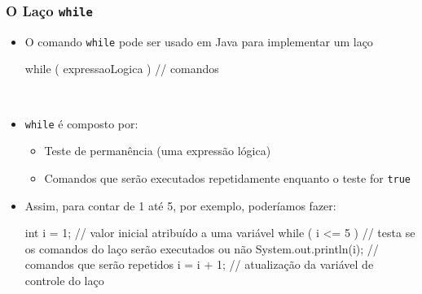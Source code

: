\documentclass[xcolor={dvipsnames,table},aspectratio=169]{beamer}
\begin{document}
\begin{frame}[fragile]\frametitle{O Laço \texttt{while}}
\begin{itemize}
	\item O comando \texttt{while} pode ser usado em Java para implementar um laço\\
{\scriptsize
\begin{javacode}
while ( expressaoLogica ) {
      // comandos
}
\end{javacode}
}\\
	\item \texttt{while} é composto por:\\
	\begin{itemize}
		\item Teste de permanência (uma expressão lógica)\\
		\item Comandos que serão executados repetidamente enquanto o teste for \texttt{true}\\
	\end{itemize}
	\item Assim, para contar de 1 até 5, por exemplo, poderíamos fazer:\\
{\scriptsize
\begin{javacode}
int i = 1;                    // valor inicial atribuído a uma variável
while ( i <= 5 ) {            // testa se os comandos do laço serão executados ou não
      System.out.println(i);  // comandos que serão repetidos
      i = i + 1;              // atualização da variável de controle do laço
}
\end{javacode}
}\\		
\end{itemize}
\end{frame}
\end{document}
